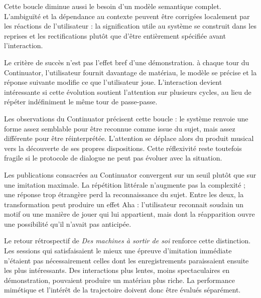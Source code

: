 \documentclass[10pt,a4paper]{article}
\begin{document}
Cette boucle diminue aussi le besoin d'un modèle semantique complet. L'ambiguïté et la dépendance au contexte peuvent être corrigées localement par les réactions de l'utilisateur : la signification utile au système se construit dans les reprises et les rectifications plutôt que d'être entièrement spécifiée avant l'interaction.

Le critère de succès n'est pas l'effet bref d'une démonstration. à chaque tour du Continuator, l'utilisateur fournit davantage de matériau, le modèle se précise et la réponse suivante modifie ce que l'utilisateur joue. L'interaction devient intéressante si cette évolution soutient l'attention sur plusieurs cycles, au lieu de répéter indéfiniment le même tour de passe-passe.

Les observations du Continuator précisent cette boucle : le système renvoie une forme assez semblable pour être reconnue comme issue du sujet, mais assez différente pour être réinterprétée. L'attention se déplace alors du produit musical vers la découverte de ses propres dispositions. Cette réflexivité reste toutefois fragile si le protocole de dialogue ne peut pas évoluer avec la situation.

Les publications consacrées au Continuator convergent sur un seuil plutôt que sur une imitation maximale. La répétition littérale n'augmente pas la complexité ; une réponse trop étrangère perd la reconnaissance du sujet. Entre les deux, la transformation peut produire un effet Aha : l'utilisateur reconnait soudain un motif ou une manière de jouer qui lui appartient, mais dont la réapparition ouvre une possibilité qu'il n'avait pas anticipée.

Le retour rétrospectif de \emph{Des machines à sortir de soi} renforce cette distinction. Les sessions qui satisfaisaient le mieux une épreuve d'imitation immédiate n'étaient pas nécessairement celles dont les enregistrements paraissaient ensuite les plus intéressants. Des interactions plus lentes, moins spectaculaires en démonstration, pouvaient produire un matériau plus riche. La performance mimétique et l'intérêt de la trajectoire doivent donc être évalués séparément.
\end{document}
